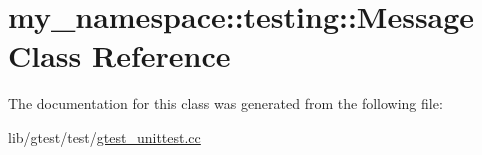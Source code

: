 \hypertarget{classmy__namespace_1_1testing_1_1_message}{\section{my\-\_\-namespace\-:\-:testing\-:\-:Message Class Reference}
\label{classmy__namespace_1_1testing_1_1_message}
}


The documentation for this class was generated from the following file\-:\begin{DoxyCompactItemize}
\item 
lib/gtest/test/\hyperlink{gtest__unittest_8cc}{gtest\-\_\-unittest.\-cc}\end{DoxyCompactItemize}
